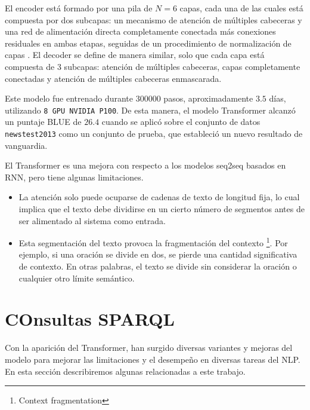 \documentclass[conference]{IEEEtran}
\begin{document}
\vspace{0.2cm}


El encoder est\'a formado por una pila de $N = 6$ capas, cada una de las cuales est\'a compuesta por dos subcapas: un mecanismo de atenci\'on de m\'ultiples cabeceras y una red de alimentaci\'on directa completamente conectada m\'as conexiones residuales \cite{b2} en ambas etapas, seguidas de un procedimiento de normalizaci\'on de capas \cite{b3}. El decoder se define de manera similar, solo que cada capa est\'a compuesta de 3 subcapas: atenci\'on de m\'ultiples cabeceras, capas completamente conectadas y atenci\'on de m\'ultiples cabeceras enmascarada.

\vspace{0.2cm}

Este modelo fue entrenado durante $300000$ pasos, aproximadamente $3.5$ d\'ias, utilizando \texttt{8 GPU NVIDIA P100}. De esta manera, el modelo Transformer alcanz\'o un puntaje BLUE \cite{b4} de $26.4$ cuando se aplic\'o sobre el conjunto de datos \texttt{newstest2013} como un conjunto de prueba, que estableci\'o un nuevo resultado de vanguardia.
\vspace{0.2cm}

El Transformer es una mejora con respecto a los modelos seq2seq basados en RNN, pero tiene algunas limitaciones.

\begin{itemize}
\item La atenci\'on solo puede ocuparse de cadenas de texto de longitud fija, lo cual implica que el texto debe dividirse en un cierto n\'umero de segmentos antes de ser alimentado al sistema como entrada. 

\item Esta segmentaci\'on del texto provoca la fragmentaci\'on del contexto \footnote{Context fragmentation}. Por ejemplo, si una oraci\'on se divide en dos, se pierde una cantidad significativa de contexto. En otras palabras, el texto se divide sin considerar la oraci\'on o cualquier otro l\'imite sem\'antico.
\end{itemize}
\section{COnsultas SPARQL}
Con la aparici\'on del Transformer, han surgido diversas variantes y mejoras del modelo para  mejorar las limitaciones  y el desempe\~no en diversas tareas del NLP. En esta secci\'on describiremos algunas relacionadas a este trabajo.
\end{document}
